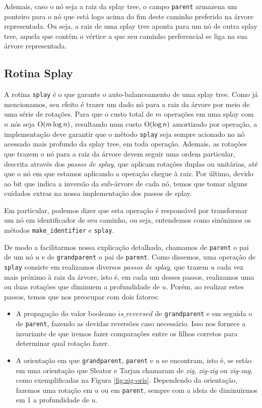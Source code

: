 Ademais, caso o nó seja a raiz da splay tree, o campo \texttt{parent} armazena um ponteiro para o nó que está logo acima do fim deste caminho preferido na árvore representada. Ou seja, a raiz de uma splay tree aponta para um nó de outra splay tree, aquela que contém o vértice a que seu caminho preferencial se liga na sua árvore representada.

\subsection{Rotina Splay}
\label{subsection:lct-splay-splay}

A rotina \texttt{splay} é o que garante o auto-balanceamento de uma splay tree. Como já mencionamos, seu efeito é trazer um dado nó para a raiz da árvore por meio de uma série de rotações. Para que o custo total de $m$ operações em uma splay com $n$ nós seja $\mathrm{O} (m \log n) $, resultando num custo $\mathrm{O}(\log n)$ amortizado por operação, a implementação deve garantir que o método \texttt{splay} seja sempre acionado no nó acessado mais profundo da splay tree, em toda operação. Ademais, as rotações que trazem o nó para a raiz da árvore devem seguir uma ordem particular, descrita através dos \emph{passos de splay}, que aplicam rotações duplas ou unitárias, até que o nó em que estamos aplicando a operação chegue à raiz. Por último, devido ao bit que indica a inversão da sub-árvore de cada nó, temos que tomar alguns cuidados extras na nossa implementação dos passos de splay.

Em particular, podemos dizer que esta operação é responsável por transformar um nó em identificador de seu caminho, ou seja, entendemos como sinônimos os métodos \texttt{make\_identifier} e \texttt{splay}.

De modo a facilitarmos nossa explicação detalhada, chamamos de \texttt{parent} o pai de um nó $u$ e de \texttt{grandparent} o pai de \texttt{parent}. Como dissemos, uma operação de \texttt{splay} consiste em realizamos diversos \emph{passos de splay}, que trazem $u$ cada vez mais próximo à raiz da árvore, isto é, em cada um desses passos, realizamos uma ou duas rotações que diminuem a profundidade de $u$. Porém, ao realizar estes passos, temos que nos preocupar com dois fatores:

\begin{itemize}
    \item A propagação do valor booleano $is\_reversed$ de \texttt{grandparent} e em seguida o de \texttt{parent}, fazendo as devidas reversões caso necessário. Isso nos fornece a invariante de que iremos fazer comparações entre os filhos corretos para determinar qual rotação fazer.
    \item A orientação em que \texttt{grandparent}, \texttt{parent} e $u$ se encontram, isto é, se estão em uma orientação que Sleator e Tarjan chamaram de \textit{zig}, \textit{zig-zig} ou \textit{zig-zag}, como exemplificadas na Figura \ref{fig:zig-oris}. Dependendo da orientação, fazemos uma rotação em $u$ ou em \texttt{parent}, sempre com a ideia de diminuirmos em 1 a profundidade de $u$.
\end{itemize}

